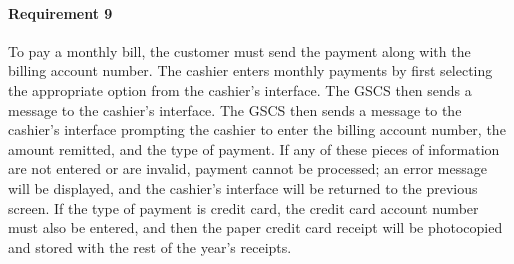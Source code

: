 \paragraph{Requirement 9} To pay a monthly bill, the customer must send
the payment along with the billing account number. The cashier enters
monthly payments by first selecting the appropriate option from the
cashier's interface. The GSCS then sends a message to the cashier's
interface. The GSCS then sends a message to the cashier's interface
prompting the cashier to enter the billing account number, the amount
remitted, and the type of payment. If any of these pieces of information
are not entered or are invalid, payment cannot be processed; an error
message will be displayed, and the cashier's interface will be returned
to the previous screen. If the type of payment is credit card, the credit
card account number must also be entered, and then the paper credit card
receipt will be photocopied and stored with the rest of the year's receipts.

